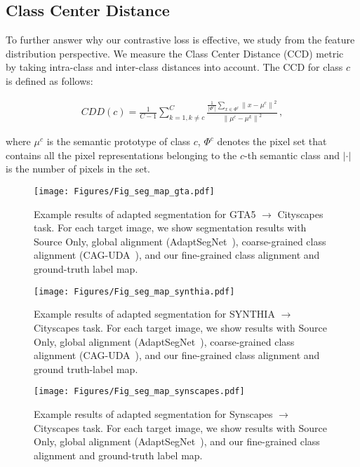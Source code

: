 \documentclass[runningheads]{llncs}
\begin{document}
\subsection{Class Center Distance}
To further answer why our contrastive loss is effective, we study from the feature distribution perspective. We measure the Class Center Distance (CCD) metric~\cite{wang2020class} by taking intra-class and inter-class distances into account. The CCD for class $c$ is defined as follows:
\begin{small}
   \begin{align}
       CDD(c) = \frac{1}{C-1}\sum_{k=1,k\neq c}^{C}\frac{\frac{1}{|\Phi^c|}\sum_{x\in \Phi^c}{\left \| x -  \mu^c \right \| }^2}{{\left \| \mu^c - \mu^k \right \|}^2 }\,,
       \label{eq:cdd}
   \end{align}
\end{small}where $\mu^c$ is the semantic prototype of class $c$, $\Phi^c$ denotes the pixel set that contains all the pixel representations belonging to the $c$-th semantic class and $|\cdot|$ is the number of pixels in the set.

\begin{figure*}
   \centering
   \texttt{[image: Figures/Fig\_seg\_map\_gta.pdf]}
   \vspace{-3mm}
   \caption{Example results of adapted segmentation for GTA5 $\rightarrow$ Cityscapes task. For each target image, we show segmentation results with Source Only, global alignment (AdaptSegNet~\cite{tsai2018learning}), coarse-grained class alignment (CAG-UDA~\cite{zhang2019category}), and our fine-grained class alignment and ground-truth label map.}
   \label{Fig_seg_map_gta}
\end{figure*}

\begin{figure*}
   \centering
   \texttt{[image: Figures/Fig\_seg\_map\_synthia.pdf]}
\caption{Example results of adapted segmentation for SYNTHIA $\rightarrow$ Cityscapes task. For each target image, we show results with Source Only, global alignment (AdaptSegNet~\cite{tsai2018learning}), coarse-grained class alignment (CAG-UDA~\cite{zhang2019category}), and our fine-grained class alignment and ground truth-label map.}
   \label{Fig_seg_map_synthia}
\end{figure*}

\begin{figure*}
   \centering
   \texttt{[image: Figures/Fig\_seg\_map\_synscapes.pdf]}
\caption{Example results of adapted segmentation for Synscapes $\rightarrow$ Cityscapes task. For each target image, we show results with Source Only, global alignment (AdaptSegNet~\cite{tsai2018learning}), and our fine-grained class alignment and ground-truth label map.}
   \label{Fig_seg_map_synscapes}
\end{figure*}
\end{document}
